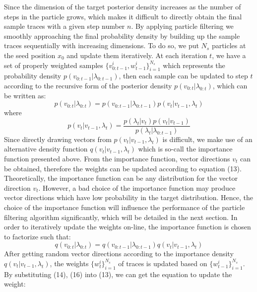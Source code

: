 Since the dimension of the target posterior density increases as the number of steps in the particle grows, which makes it difficult to directly obtain the final sample traces with a given step number $n$. By applying particle filtering we smoothly approaching the final probability density by building up the sample traces sequentially with increasing dimensions. To do so, we put ${N_s}$ particles at the seed position $x_0$ and update them iteratively. At each iteration $t$, we have a set of properly weighted samples $\{ v_{0:t-1}^i,w_{t-1}^i\} _{i = 1}^{{N_s}}$ which represents the probability density $p({v_{0:t-1}}|{\lambda_{0:t-1}})$, then each sample can be updated to step $t$ according to the recursive form of the posterior density $p({v_{0:t}}|{\lambda_{0:t}})$, which can be written as:
\begin{equation}
  p({v_{0:t}}|{\lambda_{0:t}}) = p({v_{0:t - 1}}|{\lambda_{0:t - 1}})p(v_t|v_{t-1},\lambda_t)
\end{equation}
where
\begin{equation}
  p(v_t|v_{t-1},\lambda_t) = \frac{{p({\lambda_t}|{v_t})p({v_t}|{v_{t - 1}})}}{{p({\lambda_t}|{\lambda_{0:t - 1}})}}
\end{equation}
Since directly drawing vectors from $p(v_t|v_{t-1},\lambda_t)$ is difficult, we make use of an alternative density function $q({v_t}|{v_{t - 1}},{\lambda_t})$ which is so-call the importance function presented above. From the importance function, vector directions $v_t$ can be obtained, therefore the weights can be updated according to equation (13). Theoretically, the importance function can be any distribution for the vector direction $v_t$. However, a bad choice of the importance function may produce vector directions which have low probability in the target distribution. Hence, the choice of the importance function will influence the performance of the particle filtering algorithm significantly, which will be detailed in the next section. In order to iteratively update the weights on-line, the importance function is chosen to factorize such that:
\begin{equation}
  q({v_{0:t}}|{\lambda_{0:t}}) = q({v_{0:t - 1}}|{\lambda_{0:t - 1}})q({v_t}|{v_{t - 1}},{\lambda_t})
\end{equation}
After getting random vector directions according to the importance density $q({v_t}|{v_{t - 1}},{\lambda_t})$, the weights $\{w_t^i\} _{i = 1}^{{N_s}}$ of traces is updated based on $\{w_{t-1}^i\} _{i = 1}^{{N_s}}$. By substituting (14), (16) into (13), we can get the equation to update the weight:
